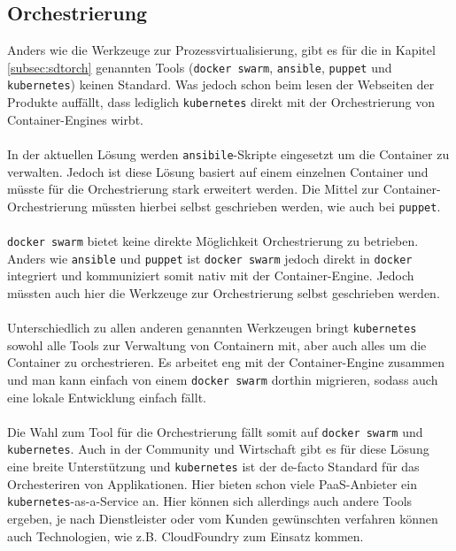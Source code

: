 \documentclass[a4paper]{article}
\begin{document}
\subsection{Orchestrierung} \label{subsec:tunorch}
Anders wie die Werkzeuge zur Prozessvirtualisierung, gibt es für die in Kapitel 
\ref{subsec:sdtorch} genannten Tools (\texttt{docker swarm}, \texttt{ansible}, 
\texttt{puppet} und \texttt{kubernetes}) keinen Standard. Was jedoch schon beim 
lesen der Webseiten der Produkte auffällt, dass lediglich \texttt{kubernetes} 
direkt mit der Orchestrierung von Container-Engines wirbt.\\
\\
In der aktuellen Lösung \cite{osmib} werden \texttt{ansibile}-Skripte 
eingesetzt um die Container zu verwalten. Jedoch ist diese Lösung basiert auf 
einem einzelnen Container und müsste für die Orchestrierung stark erweitert 
werden. Die Mittel zur Container-Orchestrierung müssten hierbei selbst 
geschrieben werden, wie auch bei \texttt{puppet}.\cite{ansible}\cite{puppet}\\
\\
\texttt{docker swarm} bietet keine direkte Möglichkeit Orchestrierung zu 
betrieben. Anders wie \texttt{ansible} und \texttt{puppet} ist
\texttt{docker swarm} jedoch direkt in \texttt{docker} integriert und 
kommuniziert somit nativ mit der Container-Engine. Jedoch müssten auch hier die 
Werkzeuge zur Orchestrierung selbst geschrieben werden.\cite{dockSwarm}\\
\\
Unterschiedlich zu allen anderen genannten Werkzeugen bringt 
\texttt{kubernetes} sowohl alle Tools zur Verwaltung von Containern mit, aber 
auch alles um die Container zu orchestrieren. Es arbeitet eng mit der 
Container-Engine zusammen und man kann einfach von einem \texttt{docker swarm} 
dorthin migrieren, sodass auch eine lokale Entwicklung einfach 
fällt.\cite{kubernetes}\\
\\
Die Wahl zum Tool für die Orchestrierung fällt somit auf \texttt{docker swarm} 
und \texttt{kubernetes}. Auch in der Community und Wirtschaft gibt es für diese 
Lösung eine breite Unterstützung und \texttt{kubernetes} ist der de-facto 
Standard für das Orchesteriren von Applikationen. Hier bieten schon viele 
\ac{PaaS}-Anbieter ein \glqq{}\texttt{kubernetes}-as-a-Service\grqq{} an. Hier
können sich allerdings auch andere Tools ergeben, je nach Dienstleister oder
vom Kunden gewünschten verfahren können auch Technologien, wie z.B. 
CloudFoundry \cite{cloudfoundry} zum Einsatz kommen.
\end{document}
